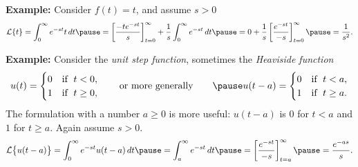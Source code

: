 \documentclass[10pt,aspectratio=169]{beamer}
\begin{document}
\begin{frame}
\textbf{Example:}
Consider $f(t) = t$, and assume $s > 0$
\begin{equation*}
\mathcal{L} \{t\}
= \int_0^\infty e^{-st} t \, dt
\pause
=
\left[ \frac{-te^{-st}}{s} \right]_{t=0}^\infty
+
\frac{1}{s}
\int_0^\infty e^{-st} \,dt
\pause
=
0
+
\frac{1}{s}
\left[ \frac{e^{-st}}{-s} \right]_{t=0}^\infty
\pause
=
\frac{1}{s^2} .
\end{equation*}

\medskip
\pause

\textbf{Example:}  Consider the
\emph{unit step function}, sometimes the
\emph{Heaviside function}
\begin{equation*}
u(t) = 
\begin{cases}
0 & \text{if } \; t < 0 , \\
1 & \text{if } \; t \geq 0 ,
\end{cases}
\qquad
\text{or more generally}
\qquad
\pause
u(t-a) = 
\begin{cases}
0 & \text{if } \; t < a , \\
1 & \text{if } \; t \geq a .
\end{cases}
\end{equation*}
\pause
The formulation with a number $a \geq 0$ is more useful:
$u(t-a)$ is $0$ for $t < a$ and $1$ for $t \geq a$.
\pause
Again assume $s > 0$.
\pause
\begin{equation*}
\mathcal{L} \bigl\{ u(t-a) \bigr\}
=
\int_0^{\infty} e^{-st} u(t-a) \, dt
\pause
=
\int_a^{\infty} e^{-st} \, dt
\pause
=
\left[ \frac{e^{-st}}{-s} \right]_{t=a}^\infty
\pause
=
\frac{e^{-as}}{s} .
\end{equation*}

\end{frame}
\end{document}
